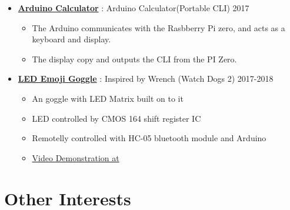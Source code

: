 \begin{itemize}
    \item \href{https://github.com/RustColeone/}{\color{link}\textbf{Arduino Calculator}} : Arduino Calculator(Portable CLI)\dashdiv{} 2017

    \begin{itemize}
      \item The Arduino communicates with the Rasbberry Pi zero, and acts as a keyboard and display.
      \item The display copy and outputs the CLI from the PI Zero.
    \end{itemize}

    \item \href{https://github.com/RustColeone/LEDEmojiGoggle}{\color{link}\textbf{LED Emoji Goggle}} : Inspired by Wrench (Watch Dogs 2)\dashdiv{} 2017-2018

    \begin{itemize}
      \item An goggle with LED Matrix built on to it
      \item LED controlled by CMOS 164 shift register IC
      \item Remotelly controlled with HC-05 bluetooth module and Arduino
      \item \href{https://www.bilibili.com/video/av33283411/}{\color{link}Video Demonstration at \bilibiliicon{}}
    \end{itemize}

  \end{itemize}

  \section{Other Interests}

